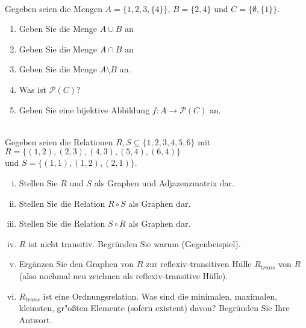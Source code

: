 \newcommand{\printpraesenzlsg}{false}
\newcommand{\printloesungen}{false}
\newcommand{\printbewertungen}{false}
\newcommand{\blattnummer}{1}




\iforiginal{}
\\
Gegeben seien die Mengen $A=\{1,2,3,\{4\}\}$, $B=\{2,4\}$ und $C=\{\emptyset,\{1\}\}$.
\begin{enumerate}
\item Geben Sie die Menge $A\cup B$ an
\item Geben Sie die Menge $A\cap B$ an
\item Geben Sie die Menge $A\setminus B$ an.
\item Was ist $\mathscr{P}(C)$?
\item Geben Sie eine bijektive Abbildung $f:A\to\mathscr{P}(C)$ an.

\end{enumerate}

\\
Gegeben seien die Relationen $R,S\subseteq\{1,2,3,4,5,6\}$ mit $R=\{(1,2),(2,3),(4,3),(5,4),(6,4)\}$\\und $S=\{(1,1),(1,2),(2,1)\}$.
\begin{enumerate}[(i)]
    \item Stellen Sie $R$ und $S$ als Graphen und Adjazenzmatrix dar.
    \item Stellen Sie die Relation $R\circ S$ als Graphen dar.
    \item Stellen Sie die Relation $S\circ R$ als Graphen dar.
    \item $R$ ist nicht transitiv. Begründen Sie warum (Gegenbeispiel).
    \item Ergänzen Sie den Graphen von $R$ zur reflexiv-transitiven Hülle $R_{trans}$ von $R$ (also nochmal neu zeichnen als reflexiv-transitive Hülle).
    \item $R_{trans}$ ist eine Ordnungsrelation. Was sind die minimalen, maximalen, kleinsten, gr"o{\ss}ten Elemente (sofern existent) davon? Begründen Sie Ihre Antwort.

\end{enumerate}


